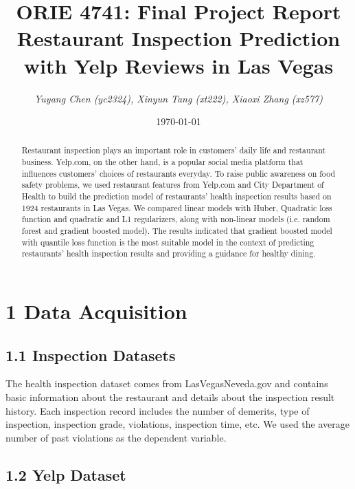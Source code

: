 \documentclass[letterpaper, 11 pt, conference]{ieeeconf}
\title{ORIE 4741: Final Project Report \\
\large Restaurant Inspection Prediction with Yelp Reviews in Las Vegas}
\author{\textit{Yuyang Chen (yc2324), Xinyun Tang (xt222), Xiaoxi Zhang (xz577)}}
\date{\today}
\begin{document}
\maketitle

\begin{abstract}
Restaurant inspection plays an important role in
customers' daily life and restaurant business. Yelp.com, on the other hand, is a popular social media platform that influences customers' choices of restaurants everyday. To raise public awareness
on food safety problems, we used restaurant features from Yelp.com and City Department of Health to build the prediction model of restaurants' health inspection results based on 1924 restaurants in Las Vegas. We compared linear models with Huber, Quadratic loss function and quadratic and L1 regularizers, along with non-linear models (i.e. random forest and gradient boosted model). The results indicated that gradient boosted model with quantile loss function is the most suitable model in the context of predicting restaurants' health inspection results and providing a guidance for healthy dining. 

\end{abstract}


\section*{1 Data Acquisition}

\subsection*{1.1 Inspection Datasets}

The health inspection dataset comes from LasVegasNeveda.gov and contains basic information about the restaurant and details about the inspection result history. Each inspection record includes the number of demerits, type of inspection, inspection grade, violations, inspection time, etc. We used the average number of past violations as the dependent variable. 


\subsection*{1.2 Yelp Dataset}
\end{document}
